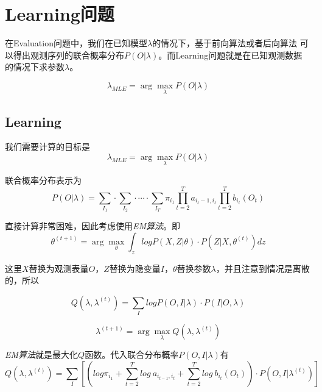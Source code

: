 \chapter{Learning问题}

在Evaluation问题中，我们在已知模型$\lambda$的情况下，基于前向算法或者后向算法
可以得出观测序列的联合概率分布$P(O|\lambda)$。而Learning问题就是在已知观测数据
的情况下求参数$\lambda$。

\begin{equation}
    \lambda_{MLE}=\arg \max\limits_{\lambda}P(O|\lambda)
\end{equation}

\section{Learning}

我们需要计算的目标是
\begin{equation}
    \lambda_{MLE}=\arg\max_{\lambda}P(O|\lambda)
\end{equation}

联合概率分布表示为
\begin{equation}
    P(O|\lambda)=\sum_{I_1}\cdot\sum_{I_2}\cdot\cdots\cdot \sum_{I_T}\pi_{i_1}\prod_{t=2}^{T}a_{i_t-1,i_t}\prod_{t=2}^{T}b_{i_t}(O_t)
\end{equation}

直接计算非常困难，因此考虑使用\textsl{EM算法}。即
\begin{equation}
    \theta^{(t+1)}=\arg\max_{\theta} \int_{z}log P(X,Z|\theta)\cdot P(Z|X,\theta^{(t)})dz
\end{equation}

这里$X$替换为观测表量$O$，$Z$替换为隐变量$I$，$\theta$替换参数$\lambda$，并且注意到情况是离散的，所以

\begin{equation}
    Q(\lambda,\lambda^{(t)}) = \sum_{I} log P(O,I|\lambda)\cdot P(I|O,\lambda)
\end{equation}

\begin{equation}
    \lambda^{(t+1)}=\arg\max_{\lambda} Q(\lambda,\lambda^{(t)})
\end{equation}

\textsl{EM算法}就是最大化$Q$函数。代入联合分布概率$P(O,I|\lambda)$有
\begin{equation}
    Q(\lambda,\lambda^{(t)}) = \sum_{I} \left[\left(log \pi_{i_1}+\sum_{t=2}^{T}log\ a_{i_{t-1},i_t}+\sum_{t=2}^{T}log\ b_{i_t}(O_t)\right)\cdot P(O,I|\lambda^{(t)})\right]
\end{equation}

